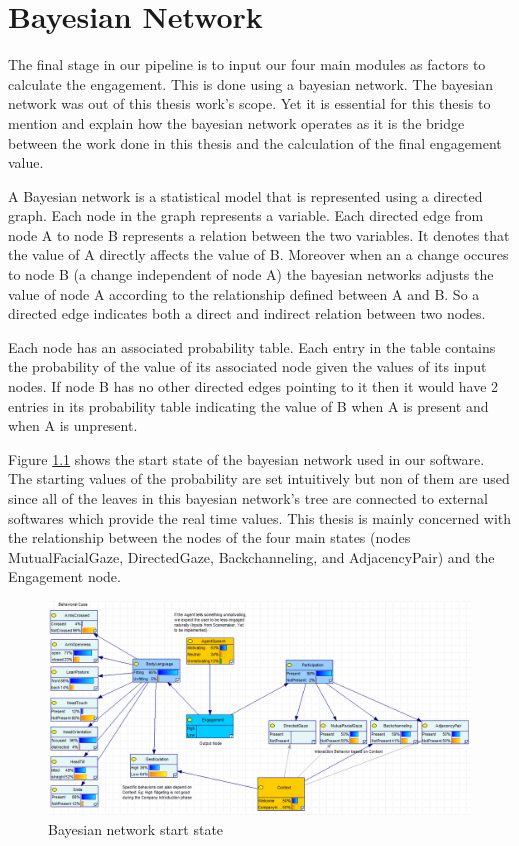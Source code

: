 \documentclass[12pt, a4paper, fleqn]{memoir}%
\begin{document}
\chapter{Bayesian Network}
\label{chap:BayesianNetwork}
The final stage in our pipeline is to input our four main modules as factors to calculate the engagement. This is done using a bayesian network. The bayesian network was out of this thesis work's scope. Yet it is essential for this thesis to mention and explain how the bayesian network operates as it is the bridge between the work done in this thesis and the calculation of the final engagement value.

A Bayesian network is a statistical model that is represented using a directed graph. Each node in the graph represents a variable. Each directed edge from node A to node B represents a relation between the two variables. It denotes that the value of A directly affects the value of B. Moreover when an a change occures to node B (a change independent of node A) the bayesian networks adjusts the value of node A according to the relationship defined between A and B. So a directed edge indicates both a direct and indirect relation between two nodes.

Each node has an associated probability table. Each entry in the table contains the probability of the value of its associated node given the values of its input nodes. If node B has no other directed edges pointing to it then it would have 2 entries in its probability table indicating the value of B when A is present and when A is unpresent.

Figure \ref{fig:BN_start_state_img} shows the start state of the bayesian network used in our software. The starting values of the probability are set intuitively but non of them are used since all of the leaves in this bayesian network's tree are connected to external softwares which provide the real time values. This thesis is mainly concerned with the relationship between the nodes of the four main states (nodes MutualFacialGaze, DirectedGaze, Backchanneling, and AdjacencyPair) and the Engagement node.

\begin{figure}[h!]
    \centering
    \includegraphics[width=1\textwidth]{BN_start_state}
    \caption{Bayesian network start state}
    \label{fig:BN_start_state_img}
\end{figure}
\end{document}
